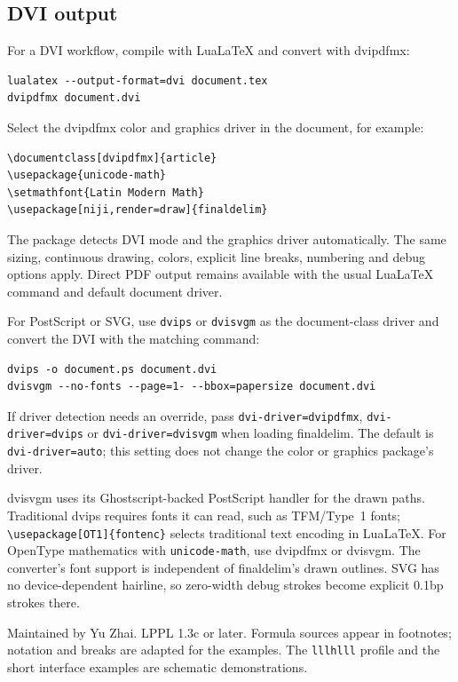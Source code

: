 \documentclass[11pt,a4paper]{article}
\begin{document}
\subsection{DVI output}
For a DVI workflow, compile with LuaLaTeX and convert with dvipdfmx:
\begin{lstlisting}[language={}]
lualatex --output-format=dvi document.tex
dvipdfmx document.dvi
\end{lstlisting}
Select the dvipdfmx color and graphics driver in the document, for example:
\begin{lstlisting}
\documentclass[dvipdfmx]{article}
\usepackage{unicode-math}
\setmathfont{Latin Modern Math}
\usepackage[niji,render=draw]{finaldelim}
\end{lstlisting}
The package detects DVI mode and the graphics driver automatically. The same
sizing, continuous drawing, colors, explicit line breaks, numbering and debug
options apply. Direct PDF output remains available with the usual LuaLaTeX
command and default document driver.

For PostScript or SVG, use \texttt{dvips} or \texttt{dvisvgm} as the document-class
driver and convert the DVI with the matching command:
\begin{lstlisting}[language={}]
dvips -o document.ps document.dvi
dvisvgm --no-fonts --page=1- --bbox=papersize document.dvi
\end{lstlisting}
If driver detection needs an override, pass \texttt{dvi-driver=dvipdfmx},
\texttt{dvi-driver=dvips} or \texttt{dvi-driver=dvisvgm} when loading finaldelim.
The default is \texttt{dvi-driver=auto}; this setting does not change the
color or graphics package's driver.

dvisvgm uses its Ghostscript-backed PostScript handler for the drawn paths.
Traditional dvips requires fonts it can read, such as TFM/Type~1 fonts;
\verb|\usepackage[OT1]{fontenc}| selects traditional text encoding in LuaLaTeX.
For OpenType mathematics with \texttt{unicode-math}, use dvipdfmx or dvisvgm.
The converter's font support is independent of finaldelim's drawn outlines.
SVG has no device-dependent hairline, so zero-width debug strokes become
explicit 0.1bp strokes there.

Maintained by Yu Zhai. LPPL 1.3c or later. Formula sources appear in footnotes;
notation and breaks are adapted for the examples. The \texttt{lllhlll} profile
and the short interface examples are schematic demonstrations.
\end{document}
